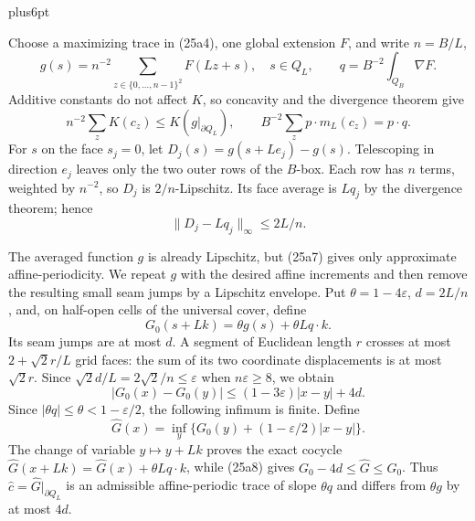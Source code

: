 \documentclass[11pt,reqno]{amsart}
\makeatletter
\theoremstyle{plain}
\theoremstyle{definition}
\theoremstyle{remark}
\renewenvironment{proof}[1][\proofname]{%
  \par
  \pushQED{\qed}%
  \normalfont
  \topsep6pt plus6pt\relax
  \trivlist
  \item[\hskip\labelsep\slshape #1\@addpunct{.}]%
  \ignorespaces
}{%
  \popQED
  \endtrivlist
  \@endpefalse
}
\DeclareRobustCommand{\qed}{%
  \leavevmode\unskip\penalty9999\hbox{}\nobreak
  \ifmmode
    \makebox[0pt][l]{\qquad\hbox{\qedsymbol}}%
  \else
    \qquad\hbox{\qedsymbol}%
  \fi
}
\renewcommand{\qedsymbol}{\rule[.47pt]{4pt}{6pt}}
\numberwithin{equation}{section}
\newcommand{\1}{\mathbf 1}
\makeatother
\begin{document}
\begin{proof}
Choose a maximizing trace in (25a4), one global extension $F$, and
write $n=B/L$,
\begin{equation}
g(s)=n^{-2}\sum_ {z\in\{0,\ldots,n-1\}^2}F(Lz+s),\quad s\in Q_ L,
\qquad q=B^{-2}\int_ {Q_ B}\nabla F.
\tag{25a5}
\end{equation}
Additive constants do not affect $K$, so concavity and the divergence
theorem give
\begin{equation}
n^{-2}\sum_ zK(c_ z)\leq K(g|_ {\partial Q_ L}),\qquad
B^{-2}\sum_ zp\cdot m_ L(c_ z)=p\cdot q.
\tag{25a6}
\end{equation}
For $s$ on the face $s_ j=0$, let
$D_ j(s)=g(s+Le_ j)-g(s)$.  Telescoping in direction $e_ j$ leaves
only the two outer rows of the $B$-box.  Each row has $n$ terms,
weighted by $n^{-2}$, so $D_ j$ is $2/n$-Lipschitz.  Its face average
is $Lq_ j$ by the divergence theorem; hence
\begin{equation}
\|D_ j-Lq_ j\|_ \infty\leq2L/n.
\tag{25a7}
\end{equation}

The averaged function $g$ is already Lipschitz, but (25a7) gives only
approximate affine-periodicity.  We repeat $g$ with the desired affine
increments and then remove the resulting small seam jumps by a Lipschitz
envelope.  Put
$\theta=1-4\varepsilon$, $d=2L/n$, and, on half-open cells of the
universal cover, define
\begin{equation*}
G_ 0(s+Lk)=\theta g(s)+\theta Lq\cdot k.
\end{equation*}
Its seam jumps are at most $d$.  A segment of Euclidean length $r$
crosses at most $2+\sqrt2r/L$ grid faces: the sum of its two coordinate
displacements is at most $\sqrt2r$.  Since
$\sqrt2d/L=2\sqrt2/n\leq\varepsilon$ when $n\varepsilon\geq8$, we obtain
\begin{equation}
|G_ 0(x)-G_ 0(y)|\leq(1-3\varepsilon)|x-y|+4d.
\tag{25a8}
\end{equation}
Since $|\theta q|\leq\theta<1-\varepsilon/2$, the following
infimum is finite.  Define
\begin{equation*}
\widehat G(x)=\inf_ y\{G_ 0(y)+(1-\varepsilon/2)|x-y|\}.
\end{equation*}
The change of variable $y\mapsto y+Lk$ proves the exact cocycle
$\widehat G(x+Lk)=\widehat G(x)+\theta Lq\cdot k$, while (25a8)
gives $G_ 0-4d\leq\widehat G\leq G_ 0$.  Thus
$\widehat c=\widehat G|_ {\partial Q_ L}$ is an admissible
affine-periodic trace of slope $\theta q$ and differs from
$\theta g$ by at most $4d$.


\end{proof}
\end{document}
